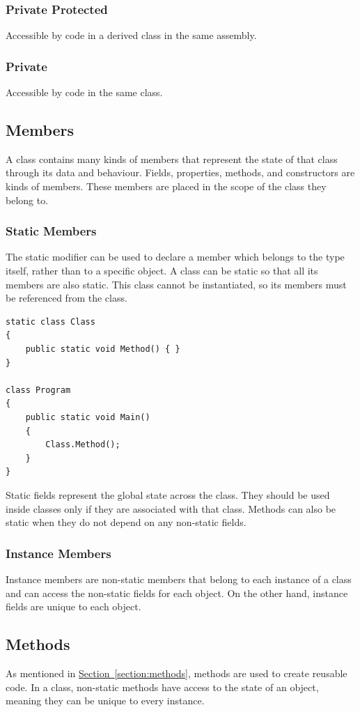 \documentclass{article}
\begin{document}
\subsubsection{Private Protected}
Accessible by code in a derived class in the same assembly.
\subsubsection{Private}
Accessible by code in the same class.
\subsection{Members}
A class contains many kinds of members that represent the state of that
class through its data and behaviour. Fields, properties, methods, and
constructors are kinds of members. These members are placed in the
scope of the class they belong to.
\subsubsection{Static Members}
The static modifier can be used to declare a member which belongs to
the type itself, rather than to a specific object. A class can be
static so that all its members are also static. This class cannot be
instantiated, so its members must be referenced from the class.
\begin{verbatim}
static class Class
{
    public static void Method() { }
}

class Program
{
    public static void Main()
    {
        Class.Method();
    }
}
\end{verbatim}
Static fields represent the global state across the class. They should
be used inside classes only if they are associated with that class.
Methods can also be static when they do not depend on any non-static
fields.
\subsubsection{Instance Members}
Instance members are non-static members that belong to each instance of
a class and can access the non-static fields for each object. On the
other hand, instance fields are unique to each object.
\subsection{Methods}
As mentioned in
\hyperref[section:methods]{Section~\ref{section:methods}}, methods are
used to create reusable code. In a class, non-static methods have
access to the state of an object, meaning they can be unique to every
instance.
\end{document}
